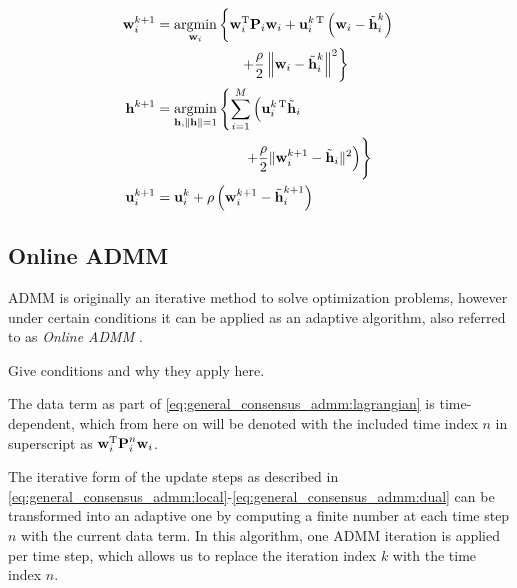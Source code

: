 \documentclass{article}
\newcommand{\h}{\mtxb{h}}
\newcommand{\w}{\mtxb{w}}
\newcommand{\uu}{\mtxb{u}}
\newcommand{\aRho}{\mtxb{P}}
\begin{document}
\begin{align}
    \w_i^{k+1} &= \underset{\w_i}{\operatorname{argmin}} \left\{ \w_i^\T \aRho_i \w_i + \uu_i^{k\,\T} \left(\w_i - \tilde{\h}_i^{k}\right) \vphantom{+ \frac{\rho}{2} \left\| \w_i - \tilde{\h}_i^{k} \right\|^2}\right.\nonumber\\
    &\left. \qquad \qquad \qquad + \frac{\rho}{2} \left\| \w_i - \tilde{\h}_i^{k} \right\|^2 \right\}\label{eq:general_consensus_admm:local}\\
    \h^{k+1} &= \underset{\h, \|\h\| = 1}{\operatorname{argmin}} \left\{ \sum_{i=1}^{M} \left( \uu_i^{k\,\T} \tilde{\h}_i \vphantom{\frac{\rho}{2} \| \w_i^{k+1} - \tilde{\h}_i \|^2} \right.\right.\nonumber\\
    &\left. \qquad \qquad \qquad \vphantom{\sum_{i=1}^{M} pp } \left.+ \frac{\rho}{2} \| \w_i^{k+1} - \tilde{\h}_i \|^2  \right) \right\}\label{eq:general_consensus_admm:global}\\
    \uu_i^{k+1} &= \uu_i^{k} + \rho \left( \w_i^{k+1} - \tilde{\h}_i^{k+1} \right)\label{eq:general_consensus_admm:dual}
\end{align}

\subsection{Online ADMM}
\label{ssec:online_admm}
ADMM is originally an iterative method to solve optimization problems, however under certain conditions it can be applied as an adaptive algorithm, also referred to as \emph{Online ADMM} \cite{}.
\begin{attention}
    Give conditions and why they apply here.
\end{attention}
The data term as part of \eqref{eq:general_consensus_admm:lagrangian} is time-dependent, which from here on  will be denoted with the included time index \(n\) in superscript as \(\w_i^\T \aRho_i^{n} \w_i\).

The iterative form of the update steps as described in \eqref{eq:general_consensus_admm:local}-\eqref{eq:general_consensus_admm:dual} can be transformed into an adaptive one by computing a finite number at each time step \(n\) with the current data term.
In this algorithm, one ADMM iteration is applied per time step, which allows us to replace the iteration index \(k\) with the time index \(n\).
\end{document}
